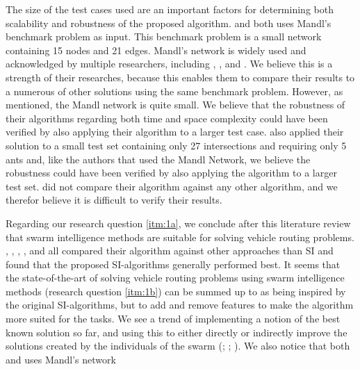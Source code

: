 The size of the test cases used are an important factors for determining both scalability and robustness of the proposed algorithm. \citet{nikolic14} and \citet{kechagiopoulos14} both uses Mandl's benchmark problem as input. This benchmark problem is a small network containing 15 nodes and 21 edges.  Mandl's network is widely used and acknowledged by multiple researchers, including \citet{baaj91}, \citet{chakroborty02}, and \citet{fan09}. We believe this is a strength of their researches, because this enables them to compare their results to a numerous of other solutions using the same benchmark problem. However, as mentioned, the Mandl network is quite small. We believe that the robustness of their algorithms regarding both time and space complexity could have been verified by also applying their algorithm to a larger test case.\citet{salehi-nezhad07} also applied their solution to a small test set containing only 27 intersections and requiring only 5 ants and, like the authors that used the Mandl Network, we believe the robustness could have been verified by also applying the algorithm to a larger test set. \citet{salehi-nezhad07} did not compare their algorithm against any other algorithm, and we therefor believe it is difficult to verify their results. \newline

Regarding our research question \ref{itm:1a}, we conclude after this literature review that swarm intelligence methods are suitable for solving vehicle routing problems. \citet{tripathi09}, \citet{dias14}, \citet{poorzahedy11}, \citet{nikolic14}, and \citet{kechagiopoulos14} all compared their algorithm against other approaches than SI and found that the proposed SI-algorithms generally performed best. It seems that the state-of-the-art of solving vehicle routing problems using swarm intelligence methods (research question \ref{itm:1b}) can be summed up to as being inspired by the original SI-algorithms, but to add and remove features to make the algorithm more suited for the tasks. We see a trend of implementing a notion of the best known solution so far, and using this to either directly or indirectly improve the  solutions created by the individuals of the swarm (\citet{tripathi09}; \citet{sedighpour14}; \citet{nikolic14}). We also notice that both \citet{nikolic14} and \citet{kechagiopoulos14} uses Mandl's network